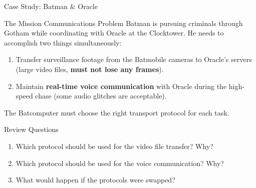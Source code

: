 \documentclass[aspectratio=169]{beamer}  %
\begin{document}
\begin{frame}{Case Study: Batman \& Oracle}
    \begin{casestudy}{The Mission Communications Problem}
        \small
        Batman is pursuing criminals through Gotham while coordinating with Oracle at the Clocktower. He needs to accomplish two things simultaneously:
        
        \vspace{0.3em}
        \begin{enumerate}\setlength{\itemsep}{2pt}
            \item Transfer surveillance footage from the Batmobile cameras to Oracle's servers (large video files, \textbf{must not lose any frames}).
            \item Maintain \textbf{real-time voice communication} with Oracle during the high-speed chase (some audio glitches are acceptable).
        \end{enumerate}
        
        \vspace{0.2em}
        The Batcomputer must choose the right transport protocol for each task.
    \end{casestudy}
    
    \begin{block}{Review Questions}
        \small
        \begin{enumerate}\setlength{\itemsep}{1pt}
            \item Which protocol should be used for the video file transfer? Why?
            \item Which protocol should be used for the voice communication? Why?
            \item What would happen if the protocols were swapped?
        \end{enumerate}
    \end{block}
\end{frame}
\end{document}
